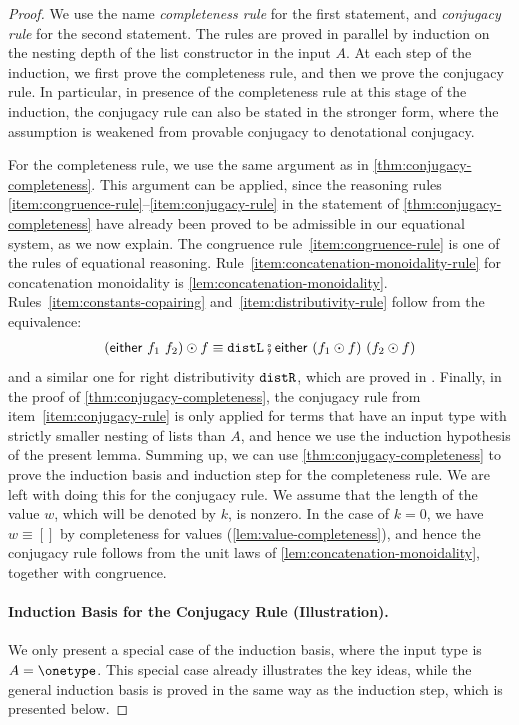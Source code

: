 \begin{proof}
    We use the name \emph{completeness rule} for the first statement, and \emph{conjugacy rule} for the second statement. The rules are proved in parallel by  induction on the nesting depth of the list constructor in the input  $A$.    At each step of the induction, we first prove the completeness rule, and then we prove the conjugacy rule. In particular, in presence of the completeness rule at this stage of the induction, the conjugacy rule can also be stated in the stronger form, where the assumption is weakened from provable conjugacy to denotational conjugacy.

    For the completeness rule, we use the same argument as in \cref{thm:conjugacy-completeness}. This argument can be applied, since the reasoning rules \ref{item:congruence-rule}--\ref{item:conjugacy-rule} in the statement of \cref{thm:conjugacy-completeness} have already been proved to be admissible in our equational system, as we now explain. The congruence rule~\ref{item:congruence-rule} is one of the rules of equational reasoning. Rule~\ref{item:concatenation-monoidality-rule} for concatenation monoidality is \cref{lem:concatenation-monoidality}. Rules~\ref{item:constants-copairing} and~\ref{item:distributivity-rule} follow from the equivalence:
        \begin{align*}
    (\either {f_1}  {f_2}) \fdot f \equiv \distlterm \comp \either{(f_1 \fdot f)}{(f_2 \fdot f)}
    \end{align*}
    and a similar one for right distributivity $\mathtt{distR}$, which are proved in . Finally, in the proof of \cref{thm:conjugacy-completeness}, the conjugacy rule from item~\ref{item:conjugacy-rule} is only applied for terms that have an input type with strictly smaller nesting of lists than $A$, and hence we use the induction hypothesis of the present lemma. Summing up, we can use \cref{thm:conjugacy-completeness} to prove the induction basis and induction step for the completeness rule.      We are left with doing this for  the conjugacy rule.  We assume that the length of the value $w$, which will be denoted by $k$, is nonzero. In the case of $k=0$, we have $w \equiv []$ by completeness for values (\cref{lem:value-completeness}), and hence the conjugacy rule follows from the unit laws of \cref{lem:concatenation-monoidality}, together with congruence.

    \paragraph*{Induction Basis for the Conjugacy Rule (Illustration).} We only present a special case of the induction basis, where the input type is $A = \onetype$. This special case already illustrates the key ideas, while the general induction basis is proved in the same way as the induction step, which is presented below.


\end{proof}
